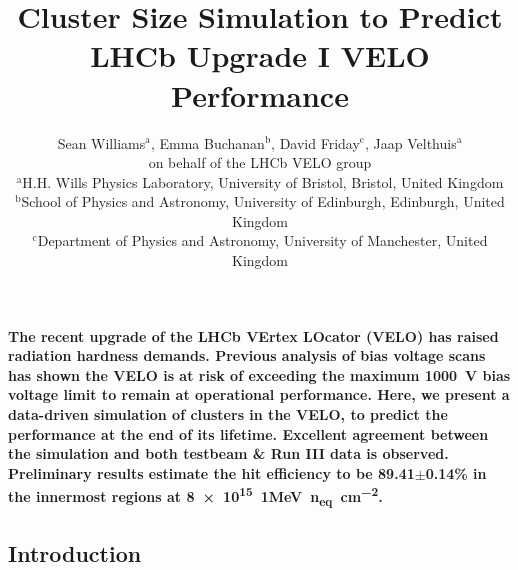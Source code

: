 \documentclass[10pt,twocolumn]{article}
\title{Cluster Size Simulation to Predict LHCb Upgrade I VELO Performance}
\author{
Sean Williams$^{\text{a}}$,
Emma Buchanan$^{\text{b}}$,
David Friday$^{\text{c}}$,
Jaap Velthuis$^{\text{a}}$\\
\vspace{0.3em}
\small on behalf of the LHCb VELO group \\
\vspace{0.5em}
\small $^{\text{a}}$H.H. Wills Physics Laboratory, University of Bristol, Bristol, United Kingdom \\
\small $^{\text{b}}$School of Physics and Astronomy, University of Edinburgh, Edinburgh, United Kingdom\\
\small $^{\text{c}}$Department of Physics and Astronomy, University of Manchester, United Kingdom
}
\date{}  %
\makeatletter
\renewcommand{\maketitle}{
\twocolumn[
  \begin{center}
    {\LARGE \@title \par}
    \vspace{0.5em}
    {\normalsize \@author \par}
    \vspace{1em}
  \end{center}
]
}
\makeatother
\begin{document}


\maketitle

    \textbf{
The recent upgrade of the LHCb VErtex LOcator (VELO) has raised radiation hardness demands. Previous analysis of bias voltage scans has shown the VELO is at risk of exceeding the maximum \qty{1000}{V} bias voltage limit to remain at operational performance. Here, we present a data-driven simulation of clusters in the VELO, to predict the performance at the end of its lifetime. Excellent agreement between the simulation and both testbeam \& Run III data is observed. Preliminary results estimate the hit efficiency to be 89.41$\pm$0.14\% in the innermost regions at \qty{8e15}{1MeV.n_{eq}.cm^{-2}}.
}

\subsection*{Introduction}
\end{document}
